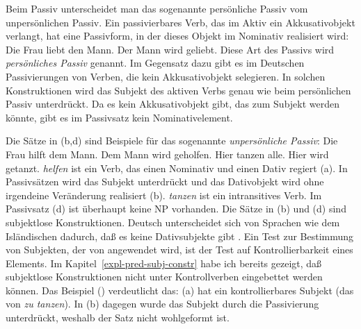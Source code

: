 \noindent
Beim Passiv unterscheidet man das sogenannte persönliche Passiv vom unpersönlichen Passiv.
Ein passivierbares Verb, das im Aktiv ein Akkusativobjekt verlangt, hat eine Passivform,
in der dieses Objekt im Nominativ realisiert wird:
\eal
\label{ex-agentive-passive}
\ex Die Frau liebt den Mann.
\ex Der Mann wird geliebt.
\zl
Diese Art des Passivs wird \emph{persönliches Passiv} genannt.
Im Gegensatz dazu gibt es im Deutschen Passivierungen von Verben, die kein
Akkusativobjekt selegieren. In solchen Konstruktionen wird das Subjekt
des aktiven Verbs genau wie beim persönlichen Passiv unterdrückt.
Da es kein Akkusativobjekt gibt, das zum Subjekt
werden könnte, gibt es im Passivsatz kein Nominativelement.

Die Sätze in (b,d) sind Beispiele für das sogenannte \emph{unpersönliche Passiv}:
\eal
\label{ex-agentive-passive-dat}
\ex Die Frau hilft dem Mann.
\ex\label{ex-dem-mann-wird-geholfen} 
Dem Mann wird geholfen.
\ex Hier tanzen alle.
\ex\label{ex-hier-wird-getanzt}
Hier wird getanzt.
\zl
\emph{helfen} ist ein Verb, das einen Nominativ und einen Dativ regiert (a).
In Passivsätzen wird das Subjekt unterdrückt und das Dativobjekt wird ohne
irgendeine Veränderung realisiert (b). \emph{tanzen} ist ein intransitives Verb.
Im Passivsatz (d) ist überhaupt keine NP vorhanden. Die Sätze in (b) und (d)
sind subjektlose Konstruktionen. 
Deutsch unterscheidet sich von Sprachen wie dem Isländischen
dadurch, daß es keine Dativsubjekte\label{page-dativsubjekte}
gibt \citep*{ZMT85a}.
Ein Test zur Bestimmung von Subjekten, der von \citet*[]{ZMT85a} angewendet wird,
ist der Test auf Kontrollierbarkeit eines Elements. Im Kapitel~\ref{expl-pred-subj-constr} habe ich bereits
gezeigt, daß subjektlose Konstruktionen nicht unter Kontrollverben eingebettet werden können.
Das Beispiel () verdeutlicht das:
\eal
{}
\zl
(a) hat ein kontrollierbares Subjekt (das von \emph{zu tanzen}). In (b) dagegen wurde das
Subjekt durch die Passivierung unterdrückt, weshalb der Satz nicht wohlgeformt ist.

